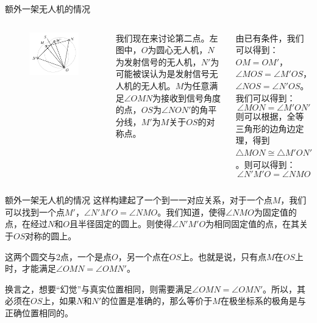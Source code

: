 \documentclass[aspectratio=169]{beamer}
\begin{document}
\begin{frame}{额外一架无人机的情况}
    \begin{columns}
        \begin{figure}[!ht]
            \centering
            \includegraphics[width = \textwidth]{图片/幻觉重合.pdf}
        \end{figure}

        我们现在来讨论第二点。左图中，$O$为圆心无人机，$N$为发射信号的无人机，$N'$为可能被误认为是发射信号无人机的无人机。$M$为任意满足$\angle OMN$为接收到信号角度的点，$OS$为$\angle NON'$的角平分线，$M'$为$M$关于$OS$的对称点。

        由已有条件，我们可以得到：$OM=OM'$，$\angle MOS = \angle M'OS$，$\angle NOS = \angle N'OS$。我们可以得到：
        \begin{equation}
            \angle MON = \angle M'ON'
        \end{equation}
        则可以根据，全等三角形的边角边定理，得到$\bigtriangleup MON \cong \bigtriangleup M'ON'$。则可以得到：
        \begin{equation}
            \angle N'M'O = \angle NMO
        \end{equation}
    \end{columns}
\end{frame}

\begin{frame}{额外一架无人机的情况}
    这样构建起了一个到一一对应关系，对于一个点$M$，我们可以找到一个点$M'$，$\angle N'M'O = \angle NMO$。我们知道，使得$\angle NMO$为固定值的点，在经过$N$和$O$且半径固定的圆上。则使得$\angle N'M'O$为相同固定值的点，在其关于$OS$对称的圆上。

    这两个圆交与2点，一个是点$O$，另一个点在$OS$上。也就是说，只有点$M$在$OS$上时，才能满足$\angle OMN = \angle OMN'$。

    换言之，想要“幻觉”与真实位置相同，则需要满足$\angle OMN = \angle OMN'$。所以，其必须在$OS$上，如果$N$和$N'$的位置是准确的，那么等价于$M$在极坐标系的极角是与正确位置相同的。
\end{frame}
\end{document}
